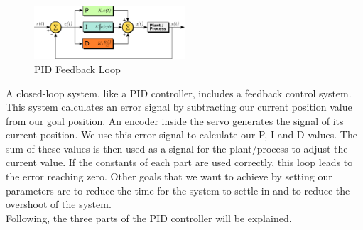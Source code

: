 \documentclass{article}
\begin{document}
\begin{figure}[H]
    \centering
    \includegraphics[width=0.5\textwidth]{img/PID_en.png}
    \caption[PID Feedback Loop]{PID Feedback Loop\footnotemark}
    \label{fig:PID}
\end{figure}


\noindent
A closed-loop system, like a PID controller, includes a feedback control system. This system calculates an error signal by subtracting our current position value from our goal position. An encoder inside the servo generates the signal of its current position. We use this error signal to calculate our P, I and D values. The sum of these values is then used as a signal for the plant/process to adjust the current value. If the constants of each part are used correctly, this loop leads to the error reaching zero. Other goals that we want to achieve by setting our parameters are to reduce the time for the system to settle in and to reduce the overshoot of the system.\\

\newpage
\noindent
Following, the three parts of the PID controller will be explained. 
\end{document}
